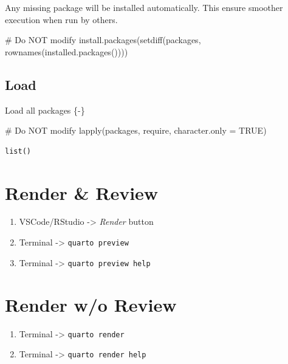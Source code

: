 \documentclass[
  letterpaper,
  DIV=11,
  numbers=noendperiod]{scrreprt}
\newenvironment{Shaded}{\begin{snugshade}}{\end{snugshade}}
\newcommand{\AttributeTok}[1]{\textcolor[rgb]{0.40,0.45,0.13}{#1}}
\newcommand{\CommentTok}[1]{\textcolor[rgb]{0.37,0.37,0.37}{#1}}
\newcommand{\ConstantTok}[1]{\textcolor[rgb]{0.56,0.35,0.01}{#1}}
\newcommand{\FunctionTok}[1]{\textcolor[rgb]{0.28,0.35,0.67}{#1}}
\newcommand{\NormalTok}[1]{\textcolor[rgb]{0.00,0.23,0.31}{#1}}
\providecommand{\tightlist}{%
  \setlength{\itemsep}{0pt}\setlength{\parskip}{0pt}}\usepackage{longtable,booktabs,array}
\begin{document}
Any missing package will be installed automatically. This ensure
smoother execution when run by others.

\begin{Shaded}
\begin{Highlighting}[]
\CommentTok{\# Do NOT modify}
\FunctionTok{install.packages}\NormalTok{(}\FunctionTok{setdiff}\NormalTok{(packages, }\FunctionTok{rownames}\NormalTok{(}\FunctionTok{installed.packages}\NormalTok{())))}
\end{Highlighting}
\end{Shaded}

\subsection{Load}\label{load-1}

Load all packages \{-\}

\begin{Shaded}
\begin{Highlighting}[]
\CommentTok{\# Do NOT modify}
\FunctionTok{lapply}\NormalTok{(packages, require, }\AttributeTok{character.only =} \ConstantTok{TRUE}\NormalTok{)}
\end{Highlighting}
\end{Shaded}

\begin{verbatim}
list()
\end{verbatim}

\section{Render \& Review}\label{render-review}

\begin{enumerate}
\def\labelenumi{\arabic{enumi}.}
\tightlist
\item
  VSCode/RStudio -\textgreater{} \emph{Render} button
\item
  Terminal -\textgreater{} \texttt{quarto\ preview}
\item
  Terminal -\textgreater{} \texttt{quarto\ preview\ help}
\end{enumerate}

\section{Render w/o Review}\label{render-wo-review}

\begin{enumerate}
\def\labelenumi{\arabic{enumi}.}
\tightlist
\item
  Terminal -\textgreater{} \texttt{quarto\ render}
\item
  Terminal -\textgreater{} \texttt{quarto\ render\ help}
\end{enumerate}
\end{document}
